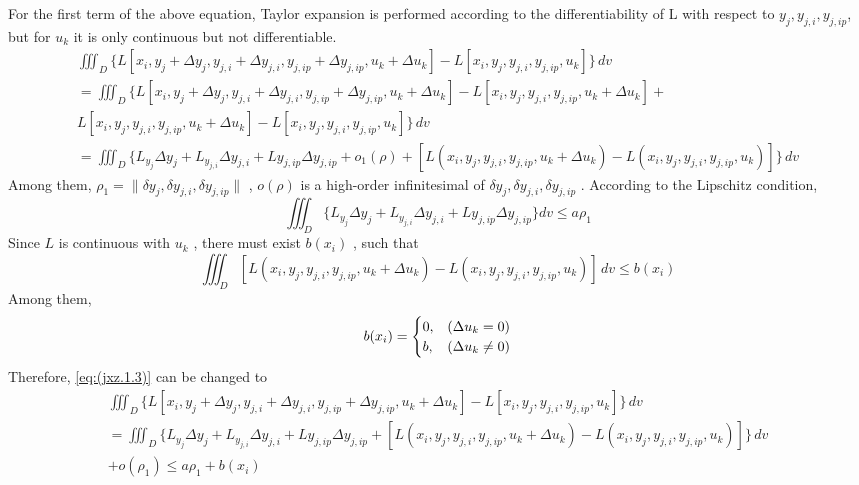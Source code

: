 For the first term of the above equation, Taylor expansion is performed according to the differentiability of L with respect to $ y_j, y_ {j, i}, y_ {j,ip}$, but for $ u_k $ it is only continuous but not differentiable.
\begin{multline} \label{eq:(jxz.1.3)}
\iiint_D \{L[x_i,y_j+\Delta y_j,y_{j,i}+\Delta y_{j,i},y_{j,ip}+\Delta y_{j,ip},u_k+\Delta u_k]-L[x_i,y_j,y_{j,i},y_{j,ip},u_k] \}\,dv 
\\=\iiint_D \{L[x_i,y_j+\Delta y_j,y_{j,i}+\Delta y_{j,i},y_{j,ip}+\Delta y_{j, ip},u_k+\Delta u_k]-
L[x_i,y_j,y_{j,i},y_{j, ip},u_k+\Delta u_k]+
\\L[x_i,y_j,y_{j,i},y_{j, ip},u_k+\Delta u_k]-
L[x_i,y_j,y_{j,i},y_{j,ip},u_k] \}\,dv 
\\=\iiint_D \{L_{y_j} \Delta y_j + L_{y_{j,i}} \Delta y_{j,i}+L{y_{j,ip} \Delta y_{j,ip} +o_1(\rho)+[L(x_i,y_j,y_{j,i},y_{j,ip},u_k+\Delta u_k)-L(x_i,y_j,y_{j,i},y_{j,ip},u_k)]}\}\,dv
\end{multline}
Among them, $ \rho_1=\| \delta y_j, \delta y_ {j, i}, \delta y_ {j, ip} \| $ , $ o (\rho) $ is a high-order infinitesimal of $ \delta y_j, \delta y_ {j, i}, \delta y_ {j, ip}$  .
According to the Lipschitz condition,
\begin{equation} \label{eq:(jxz.1.4)}
\iiint_D \{L_{y_j} \Delta y_j + L_{y_{j,i}} \Delta y_{j,i}+L{y_{j,ip}} \Delta y_{j,ip} \}dv \leq  a \rho_{1}    
\end{equation}
Since $ L$  is continuous with $ u_k $ , there must exist $ b (x_i) $ , such that
\begin{equation} \label{eq:(jxz.1.5)}
\iiint_D [L(x_i,y_j,y_{j,i},y_{j,ip},u_k+\Delta u_k)-L(x_i,y_j,y_{j,i},y_{j,ip},u_k)]\,dv \leq b(x_i) 
\end{equation}
Among them,
\begin{equation} \label{eq:(jxz.1.6)}    
b(x_i)=
\begin{cases}
0, & \text(\Delta u_k=0)\\
b, & \text(\Delta u_k\neq 0)
\end{cases}
\end{equation}
Therefore, \ref{eq:(jxz.1.3)} can be changed to
\begin{multline} \label{eq:(jxz.1.7)}
\iiint_D \{L[x_i,y_j+\Delta y_j,y_{j,i}+\Delta y_{j,i},y_{j,ip}+\Delta y_{j,ip},u_k+\Delta u_k]-L[x_i,y_j,y_{j,i},y_{j,ip},u_k] \}\,dv 
\\=\iiint_D \{L_{y_j} \Delta y_j + L_{y_{j,i}} \Delta y_{j,i}+L{y_{j,ip} \Delta y_{j,ip}
+[L(x_i,y_j,y_{j,i},y_{j,ip},u_k+\Delta u_k)-L(x_i,y_j,y_{j,i},y_{j,ip},u_k)]}\} \,dv 
\\+o(\rho_1) \leq a \rho_1+b(x_i)
\end{multline} 
